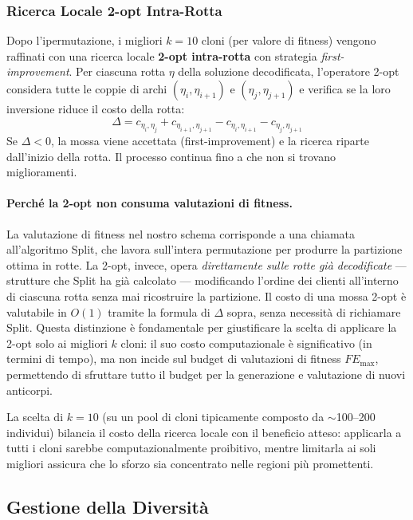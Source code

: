 \documentclass[a4paper,12pt]{article}
\begin{document}
\subsubsection{Ricerca Locale 2-opt Intra-Rotta}

Dopo l'ipermutazione, i migliori $k = 10$ cloni (per valore di fitness) vengono raffinati con una ricerca locale \textbf{2-opt intra-rotta} con strategia \emph{first-improvement}. Per ciascuna rotta $\eta$ della soluzione decodificata, l'operatore 2-opt considera tutte le coppie di archi $(\eta_i, \eta_{i+1})$ e $(\eta_j, \eta_{j+1})$ e verifica se la loro inversione riduce il costo della rotta:
\begin{equation}
    \Delta = c_{\eta_i,\eta_j} + c_{\eta_{i+1},\eta_{j+1}} - c_{\eta_i,\eta_{i+1}} - c_{\eta_j,\eta_{j+1}}
\end{equation}
Se $\Delta < 0$, la mossa viene accettata (first-improvement) e la ricerca riparte dall'inizio della rotta. Il processo continua fino a che non si trovano miglioramenti.

\paragraph{Perché la 2-opt non consuma valutazioni di fitness.} La valutazione di fitness nel nostro schema corrisponde a una chiamata all'algoritmo Split, che lavora sull'intera permutazione per produrre la partizione ottima in rotte. La 2-opt, invece, opera \emph{direttamente sulle rotte già decodificate} --- strutture che Split ha già calcolato --- modificando l'ordine dei clienti all'interno di ciascuna rotta senza mai ricostruire la partizione. Il costo di una mossa 2-opt è valutabile in $O(1)$ tramite la formula di $\Delta$ sopra, senza necessità di richiamare Split. Questa distinzione è fondamentale per giustificare la scelta di applicare la 2-opt solo ai migliori $k$ cloni: il suo costo computazionale è significativo (in termini di tempo), ma non incide sul budget di valutazioni di fitness $FE_{\max}$, permettendo di sfruttare tutto il budget per la generazione e valutazione di nuovi anticorpi.

La scelta di $k = 10$ (su un pool di cloni tipicamente composto da $\sim$100--200 individui) bilancia il costo della ricerca locale con il beneficio atteso: applicarla a tutti i cloni sarebbe computazionalmente proibitivo, mentre limitarla ai soli migliori assicura che lo sforzo sia concentrato nelle regioni più promettenti.

\subsection{Gestione della Diversità}
\end{document}
